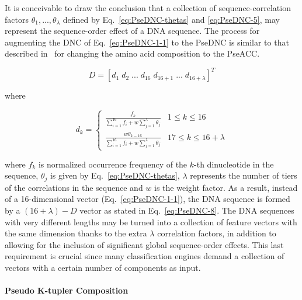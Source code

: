 It is conceivable to draw the conclusion that a collection of sequence-correlation factors $\theta_{1},...,\theta_{\lambda}$ defined by Eq.~\ref{eq:PseDNC-thetas} and \ref{eq:PseDNC-5}, may represent the sequence-order effect of a \gls{DNA} sequence. The process for augmenting the \gls{DNC} of Eq.~\ref{eq:PseDNC-1-1} to the \gls{PseDNC} is similar to that described in~\cite{Chou2001PredictionComposition} for changing the amino acid composition to the \gls{PseACC}.

\begin{equation}\label{eq:PseDNC-8}
    D = [d_{1}\;d_{2}\;...\;d_{16}\;d_{16+1}\;...\;d_{16+\lambda}]^{T}
\end{equation}

\noindent where

\begin{equation}\label{eq:PseDNC-9}
    d_{k} = \begin{cases}\frac{f_{k}}{\sum_{i=1}^{16} f_{i} + w\sum_{j=1}^{\lambda}\theta_{j}} & 1 \le k \le 16\\\frac{w\theta_{k-16}}{\sum_{i=1}^{16} f_{i} + w\sum_{j=1}^{\lambda}\theta_{j}} & 17 \le k \le 16 + \lambda\end{cases}
\end{equation}

\noindent where $f_{k}$ is normalized occurrence frequency of the $k$-th dinucleotide in the sequence, $\theta_{j}$ is given by Eq.~\ref{eq:PseDNC-thetas}, $\lambda$ represents the number of tiers of the correlations in the sequence and $w$ is the weight factor. As a result, instead of a 16-dimensional vector (Eq.~\ref{eq:PseDNC-1-1}), the \gls{DNA} sequence is formed by a $(16 + \lambda) - D$ vector as stated in Eq.~\ref{eq:PseDNC-8}. The \gls{DNA} sequences with very different lengths may be turned into a collection of feature vectors with the same dimension thanks to the extra $\lambda$ correlation factors, in addition to allowing for the inclusion of significant global sequence-order effects. This last requirement is crucial since many classification engines demand a collection of vectors with a certain number of components as input.


\paragraph{Pseudo K-tupler Composition}

